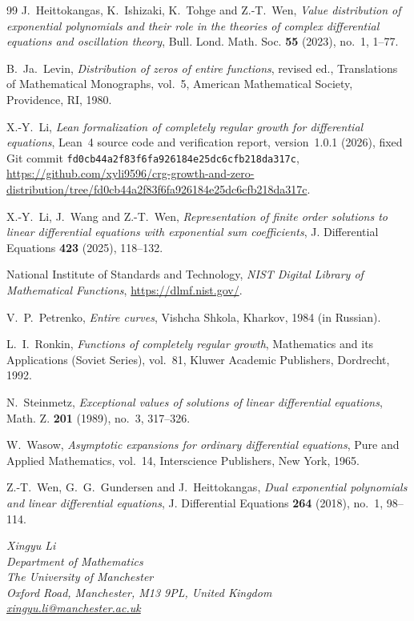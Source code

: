 \documentclass[a4paper,12pt]{article}
\numberwithin{equation}{section}
\begin{document}
\begin{thebibliography}{99}
J.~Heittokangas, K.~Ishizaki, K.~Tohge and Z.-T.~Wen,
\emph{Value distribution of exponential polynomials and their role in the theories of complex differential equations and oscillation theory},
Bull. Lond. Math. Soc. \textbf{55} (2023), no.~1, 1--77.

B.~Ja.~Levin,
\emph{Distribution of zeros of entire functions}, revised ed.,
Translations of Mathematical Monographs, vol.~5,
American Mathematical Society, Providence, RI, 1980.

X.-Y.~Li,
\emph{Lean formalization of completely regular growth for differential equations},
Lean~4 source code and verification report, version~1.0.1 (2026),
fixed Git commit \texttt{fd0cb44a2f83f6fa926184e25dc6cfb218da317c},
\url{https://github.com/xyli9596/crg-growth-and-zero-distribution/tree/fd0cb44a2f83f6fa926184e25dc6cfb218da317c}.

X.-Y.~Li, J.~Wang and Z.-T.~Wen,
\emph{Representation of finite order solutions to linear differential equations with exponential sum coefficients},
J. Differential Equations \textbf{423} (2025), 118--132.

National Institute of Standards and Technology,
\emph{NIST Digital Library of Mathematical Functions},
\url{https://dlmf.nist.gov/}.

V.~P.~Petrenko,
\emph{Entire curves},
Vishcha Shkola, Kharkov, 1984 (in Russian).

L.~I.~Ronkin,
\emph{Functions of completely regular growth},
Mathematics and its Applications (Soviet Series), vol.~81,
Kluwer Academic Publishers, Dordrecht, 1992.

N.~Steinmetz,
\emph{Exceptional values of solutions of linear differential equations},
Math. Z. \textbf{201} (1989), no.~3, 317--326.

W.~Wasow,
\emph{Asymptotic expansions for ordinary differential equations},
Pure and Applied Mathematics, vol.~14,
Interscience Publishers, New York, 1965.

Z.-T.~Wen, G.~G.~Gundersen and J.~Heittokangas,
\emph{Dual exponential polynomials and linear differential equations},
J. Differential Equations \textbf{264} (2018), no.~1, 98--114.

\end{thebibliography}
	
	\bigskip
	\noindent
	{\itshape
Xingyu Li\\
Department of Mathematics\\
The University of Manchester\\
Oxford Road, Manchester, M13 9PL, United Kingdom\\
\href{mailto:xingyu.li@manchester.ac.uk}{xingyu.li@manchester.ac.uk}\par
}
\end{document}
